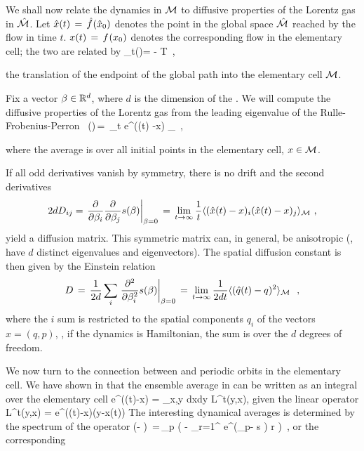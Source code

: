\documentclass[aps,pre,showpacs,preprint,groupedaddress,floatfix]{revtex4-1}
\begin{document}
We shall now relate the dynamics in ${\cal M}$ to diffusive properties of
the Lorentz gas in $\hat {{\cal M}}$. Let $\hat x(t)\,=\,{\hat{f}^{}(\hat x_0)}$ denotes the
point in the global space $\hat {{\cal M}}$ reached by the flow in time
$t$. $x(t)\,=\,{f^{}({x_0})}$ denotes the corresponding flow in the
elementary cell; the two are related by
 \beq \hn_t(\xInit)=
\hflow{\xInit} - \flow{\xInit} \in T \,, 

the translation of the endpoint of the global path into the elementary
cell $\pS$.

Fix a vector $\beta \in \reals^d$, where $d$ is the dimension of the
{\statesp}. We will compute the diffusive properties of the Lorentz
gas from the leading eigenvalue of the Rulle-Frobenius-Perron \evOper\
\beq \eigenvL(\beta)\,=\, \lim_{t \rightarrow \infty}  \log
\langle e^{\beta \cdot (\hx(t) -x) } \rangle_\pS ~, \quad
{}

where the average is over all initial points in the elementary cell,
$x \in \pS$.

If all odd derivatives vanish by symmetry, there is no drift and the
second derivatives
\[
2d D_{ij} = \left . {\frac{\partial}{\partial \beta_i}}
  {\frac{\partial} {\partial \beta_j}} \eigenvL(\beta)\right
|_{\beta=0} \,=\,\lim_{t\rightarrow \infty} {\frac{1}{t}} \langle
{(\hx(t) -x)_i (\hx(t) -x)_j } \rangle_\pS ~,
\]
yield a diffusion matrix.  This symmetric matrix can, in general, be
anisotropic (\ie, have $d$ distinct eigenvalues and
eigen\-vectors). The spatial diffusion constant is then given by the
Einstein relation
\[
D\,=\,{1\over 2 d} \sum_i \left .{{\partial}^2 \over {\partial
      \beta^2_i}} s(\beta)\right |_{\beta=0} \,=\,
\lim_{t\rightarrow \infty} {1\over{2d t}} \langle {(\hat{q}(t) -q)^2 }
\rangle_{{\cal M}}~ ~,
\]
where the $i$ sum is restricted to the spatial components $q_i$ of the
{\statesp} vectors $x=(q,p)$, \ie, if the dynamics is Hamiltonian, the
sum is over the $d$ degrees of freedom.


We now turn to the connection between  and periodic
orbits in the elementary cell. We have shown in \refref{CGS92} that the ensemble average in  can be written as an integral over the elementary cell
\beq
\langle e^{\beta\cdot(\hx(t)-x)} \rangle = \int_{x,y\in \pS} dxdy {\cal L}^t(y,x),
\eeq
given the linear \evOper operator
\beq
{\cal L}^t(y,x) = e^{\beta\cdot(\hx(t)-x)}\delta(y-x(t))
\eeq
The interesting dynamical averages is determined by the spectrum of the
operator
 \beq \det(\eigenvL - \Lop) \,=\,\prod_{p} \exp \left(
  - { \sum_{r=1}^ { e^{(\beta \cdot \hn_p- s
        ) r}
      \over {} }
  } \right) \,,  
or the corresponding \dzeta\
 
\end{document}
